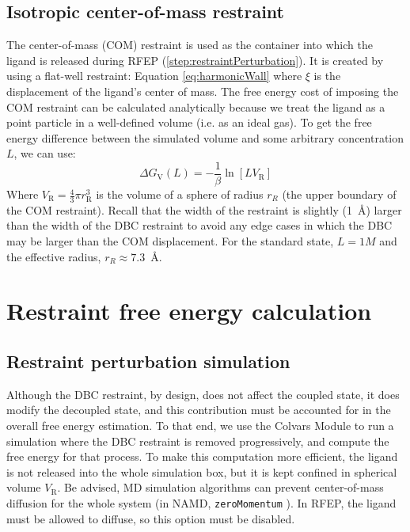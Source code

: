 \documentclass[9pt,tutorial]{Styling/livecoms}
\newcommand{\textInput}[1]{
  \texttt{#1}
}
\begin{document}
\subsection{Isotropic center-of-mass restraint} \label{app:COMCorrection}
The center-of-mass (COM) restraint is used as the container into which the ligand is released during RFEP (\ref{step:restraintPerturbation}). It is created by using a flat-well restraint: Equation \ref{eq:harmonicWall} where $\xi$ is the displacement of the ligand's center of mass.
The free energy cost of imposing the COM restraint can be calculated analytically because we treat the ligand as a point particle in a well-defined volume (i.e. as an ideal gas).
To get the free energy difference between the simulated volume and some arbitrary concentration $L$, we can use:
 \begin{equation}\label{eq:dGV}
     \Delta G_\mathrm{V}(L)=-\frac{1}{\beta} \ln [L V_\mathrm{R}]
 \end{equation}
Where $V_\mathrm{R}=\frac{4}{3}\pi r_\mathrm{R}^{3}$ is the volume of a sphere of radius $r_R$ (the upper boundary of the COM restraint). \cite{Salari2018} 
Recall that the width of the restraint is slightly (1~\AA{}) larger than the width of the DBC restraint to avoid any edge cases in which the DBC may be larger than the COM displacement. For the standard state, $L=1M$ and the effective radius, $r_R\approx7.3$~\AA{}.

\section{Restraint free energy calculation}\label{app:RFEP}

\subsection{Restraint perturbation simulation}

Although the DBC restraint, by design, does not affect the coupled state, it does modify the decoupled state, and this contribution must be accounted for in the overall free energy estimation. To that end, we use the Colvars Module to run a simulation where the DBC restraint is removed progressively, and compute the free energy for that process.
To make this computation more efficient, the ligand is not released into the whole simulation box, but it is kept confined in spherical volume $V_\mathrm{R}$. Be advised, MD simulation algorithms can prevent center-of-mass diffusion for the whole system (in NAMD, \textInput{zeroMomentum}). In RFEP, the ligand must be allowed to diffuse, so this option must be disabled.
\end{document}
